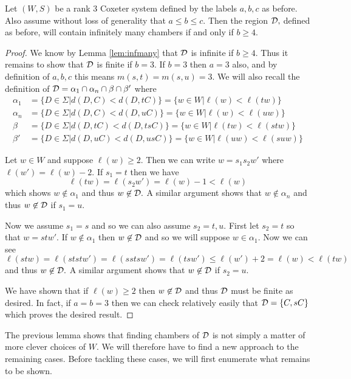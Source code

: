 \documentclass[class=book, crop=false]{standalone}
\begin{document}
\begin{lemma} 
	\label{lem:infD}
	Let $(W,S)$ be a rank 3 Coxeter system defined by the labels $a,b,c$ as before. Also assume without loss of generality that $a\le b\le c.$ Then the region $\mathcal{D},$ defined as before, will contain infinitely many chambers if and only if $b\ge 4.$
\end{lemma}
\begin{proof}
	We know by Lemma \ref{lem:infmany} that $\mathcal{D}$ is infinite if $b\ge 4.$ Thus it remains to show that $\mathcal{D}$ is finite if $b=3.$ If $b=3$ then $a=3$ also, and by definition of $a,b,c$ this means $m(s,t)=m(s,u)=3.$ We will also recall the definition of $\mathcal{D}=\alpha_1\cap \alpha_n\cap \beta \cap \beta'$ where
	\begin{align*}
	\alpha_1&=\{D\in \Sigma|d(D,C)<d(D,tC)\}=\{w\in W|\ell(w)<\ell(tw)\}\\
	\alpha_n&=\{D\in \Sigma|d(D,C)<d(D,uC)\}=\{w\in W|\ell(w)<\ell(uw)\}\\
	\beta&=\{D\in \Sigma|d(D,tC)<d(D,tsC)\}=\{w\in W|\ell(tw)<\ell(stw)\}\\
	\beta'&=\{D\in \Sigma|d(D,uC)<d(D,usC)\}=\{w\in W|\ell(uw)<\ell(suw)\}
\end{align*}

Let $w\in W$ and suppose $\ell(w)\ge 2.$ Then we can write $w=s_1s_2w'$ where $\ell(w')=\ell(w)-2.$ If $s_1=t$ then we have
\[
	\ell(tw)=\ell(s_2w')=\ell(w)-1<\ell(w)
\]
which shows $w\not\in \alpha_1$ and thus $w\not\in \mathcal{D}.$ A similar argument shows that $w\not\in \alpha_n$ and thus $w\not\in \mathcal{D}$ if $s_1=u.$

Now we assume $s_1=s$ and so we can also assume $s_2=t,u.$ First let $s_2=t$ so that $w=stw'.$ If $w\not\in \alpha_1$ then $w\not\in \mathcal{D}$ and so we will suppose $w\in\alpha_1.$ Now we can see
\[
	\ell(stw)=\ell(ststw')=\ell(sstsw')=\ell(tsw')\le \ell(w')+2=\ell(w)<\ell(tw)
\]
and thus $w\not\in \mathcal{D}.$ A similar argument shows that $w\not\in \mathcal{D}$ if $s_2=u.$

We have shown that if $\ell(w)\ge 2$ then $w\not\in \mathcal{D}$ and thus $\mathcal{D}$ must be finite as desired. In fact, if $a=b=3$ then we can check relatively easily that $\mathcal{D}=\{C,sC\}$ which proves the desired result.
\end{proof}

The previous lemma shows that finding chambers of $\mathcal{D}$ is not simply a matter of more clever choices of $W.$ We will therefore have to find a new approach to the remaining cases. Before tackling these cases, we will first enumerate what remains to be shown.
\end{document}
